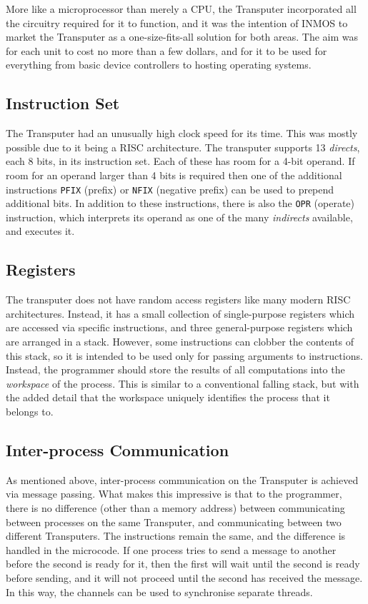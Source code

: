 More like a microprocessor than merely a CPU, the Transputer incorporated all
the circuitry required for it to function, and it was the intention of INMOS to
market the Transputer as a one-size-fits-all solution for both areas. The aim
was for each unit to cost no more than a few dollars, and for it to be used for
everything from basic device controllers to hosting operating systems.

\subsection{Instruction Set}

The Transputer had an unusually high clock speed for its time. This was mostly
possible due to it being a RISC architecture. The transputer supports 13
\textit{\gls{direct}s}, each 8 bits, in its instruction set. Each of these
has room for a 4-bit operand. If room for an operand larger than 4 bits is
required then one of the additional instructions \texttt{PFIX} (prefix) or
\texttt{NFIX} (negative prefix) can be used to prepend additional bits. In
addition to these instructions, there is also the \texttt{OPR} (operate)
instruction, which interprets its operand as one of the many
\textit{\gls{indirect}s} available, and executes it.

\subsection{Registers}

The transputer does not have random access registers like many modern RISC
architectures. Instead, it has a small collection of single-purpose registers
which are accessed via specific instructions, and three general-purpose
registers which are arranged in a stack. However, some instructions can clobber
the contents of this stack, so it is intended to be used only for passing
arguments to instructions. Instead, the programmer should store the results of
all computations into the \textit{\gls{workspace}} of the process. This is
similar to a conventional falling stack, but with the added detail that the
workspace uniquely identifies the process that it belongs to.

\subsection{Inter-process Communication}

As mentioned above, inter-process communication on the Transputer is achieved
via message passing. What makes this impressive is that to the programmer, there
is no difference (other than a memory address) between communicating between
processes on the same Transputer, and communicating between two different
Transputers. The instructions remain the same, and the difference is handled in
the microcode. If one process tries to send a message to another before the
second is ready for it, then the first will wait until the second is ready
before sending, and it will not proceed until the second has received the
message. In this way, the channels can be used to synchronise separate threads.

